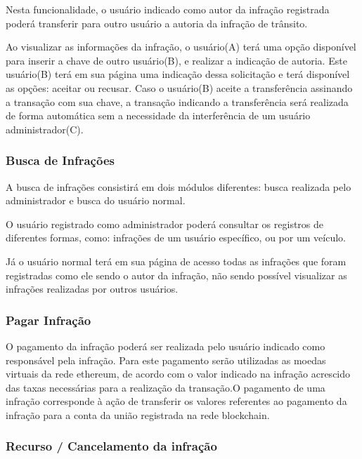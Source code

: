         Nesta funcionalidade, o usuário indicado como autor da infração registrada poderá transferir para outro usuário a autoria da infração de trânsito.
        
        Ao visualizar as informações da infração, o usuário(A) terá uma opção disponível para inserir a chave de outro usuário(B), e realizar a indicação de autoria. Este usuário(B) terá em sua página uma indicação dessa solicitação e terá disponível as opções: aceitar ou recusar. Caso o usuário(B) aceite a transferência assinando a transação com sua chave, a transação indicando a transferência será realizada de forma automática sem a necessidade da interferência de um usuário administrador(C).
    
    \subsubsection{Busca de Infrações}
    
        A busca de infrações consistirá em dois módulos diferentes: busca realizada pelo administrador e busca do usuário normal.
        
        O usuário registrado como administrador poderá consultar os registros de diferentes formas, como: infrações de um usuário específico, ou por um veículo.
        
        Já o usuário normal terá em sua página de acesso todas as infrações que foram registradas como ele sendo o autor da infração, não sendo possível visualizar as infrações realizadas por outros usuários.
    
    \subsubsection{Pagar Infração}
    
        O pagamento da infração poderá ser realizada pelo usuário indicado como responsável pela infração. Para este pagamento serão utilizadas as moedas virtuais da rede ethereum, de acordo com o valor indicado na infração acrescido das taxas necessárias para a realização da transação.O pagamento de uma infração corresponde à ação de transferir os valores referentes ao pagamento da infração para a conta da união registrada na rede blockchain.
    
    
    \subsubsection{Recurso / Cancelamento da infração}
    
